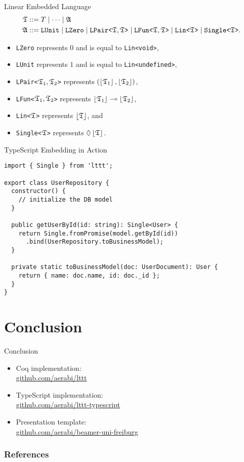 \begin{frame}{Linear Embedded Language}
    \begin{align*}
    \mathfrak{T} &::= T \mid \cdots \mid \mathfrak{A} \\
    \mathfrak{A} &::= \mathtt{LUnit} \mid \mathtt{LZero} \mid \mbox{\texttt{LPair<}}\mathfrak{T}, \mathfrak{T}\mbox{\texttt{>}} \mid \mbox{\texttt{LFun<}}\mathfrak{T}, \mathfrak{T}\mbox{\texttt{>}} \mid \mbox{\texttt{Lin<}}\mathfrak{T}\mbox{\texttt{>}} \mid \mbox{\texttt{Single<}}\mathfrak{T}\mbox{\texttt{>}}.
    \end{align*}
    
    \begin{itemize}
        \item \texttt{LZero} represents $0$ and is equal to \texttt{Lin<void>},
        \item \texttt{LUnit} represents $1$ and is equal to \texttt{Lin<undefined>},
        \item \texttt{LPair<}$\mathfrak{T}_1, \mathfrak{T}_2$\texttt{>} represents $(\left\lfloor \mathfrak{T}_1 \right\rfloor, \left\lfloor \mathfrak{T}_2 \right\rfloor)$,
        \item \texttt{LFun<}$\mathfrak{T}_1, \mathfrak{T}_2$\texttt{>} represents $\left\lfloor \mathfrak{T}_1 \right\rfloor \multimap \left\lfloor \mathfrak{T}_2 \right\rfloor$,
        \item \texttt{Lin<}$\mathfrak{T}$\texttt{>} represents $\left\lfloor \mathfrak{T} \right\rfloor$, and
        \item \texttt{Single<}$\mathfrak{T}$\texttt{>} represents $\lozenge\left\lfloor \mathfrak{T} \right\rfloor$.
    \end{itemize}
\end{frame}

\begin{frame}[fragile]{TypeScript Embedding in Action}
    \begin{verbatim}
import { Single } from 'lttt';

export class UserRepository {
  constructor() {
    // initialize the DB model
  }
  
  public getUserById(id: string): Single<User> {
    return Single.fromPromise(model.getById(id))
      .bind(UserRepository.toBusinessModel);
  }
  
  private static toBusinessModel(doc: UserDocument): User {
    return { name: doc.name, id: doc._id };
  }
}
    \end{verbatim}
\end{frame}

\section{Conclusion}

\begin{frame}{Conclusion}
    \begin{itemize}
        \item Coq implementation: \\
        \url{github.com/aerabi/lttt}
        \item TypeScript implementation: \\
        \url{github.com/aerabi/lttt-typescript}
        \item Presentation template: \\
        \url{github.com/aerabi/beamer-uni-freiburg}
    \end{itemize}
\end{frame}

\begin{frame}[t,allowframebreaks]
\nocite{*}
\frametitle{References}


\end{frame}
